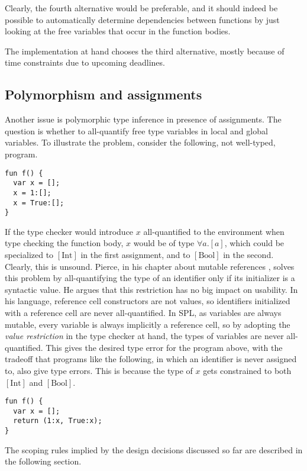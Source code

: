 \documentclass[a4paper]{article}
\begin{document}
Clearly, the fourth alternative would be preferable, and it should indeed be
possible to automatically determine dependencies between functions by just
looking at the free variables that occur in the function bodies.

The implementation at hand chooses the third alternative, mostly because of time
constraints due to upcoming deadlines.

\subsection{Polymorphism and assignments}

Another issue is polymorphic type inference in presence of assignments.  The
question is whether to all-quantify free type variables in local and global
variables.  To illustrate the problem, consider the following, not well-typed,
program.

\begin{verbatim}
fun f() {
  var x = [];
  x = 1:[];
  x = True:[];
}
\end{verbatim}

If the type checker would introduce $x$ all-quantified to the environment when
type checking the function body, $x$ would be of type $\forall a . [a]$, which
could be specialized to $[\text{Int}]$ in the first assignment, and to
$[\text{Bool}]$ in the second.  Clearly, this is unsound.  Pierce, in his
chapter about mutable references \cite{TaPL}, solves this problem by
all-quantifying the type of an identifier only if its initializer is a syntactic
value.  He argues that this restriction has no big impact on usability.  In his
language, reference cell constructors are not values, so identifiers initialized
with a reference cell are never all-quantified.  In SPL, as variables are always
mutable, every variable is always implicitly a reference cell, so by adopting
the \emph{value restriction} in the type checker at hand, the types of variables
are never all-quantified.  This gives the desired type error for the program
above, with the tradeoff that programs like the following, in which an identifier
is never assigned to, also give type errors. This is because the type of $x$ gets
constrained to both $[\text{Int}]$ and $[\text{Bool}]$.

\begin{verbatim}
fun f() {
  var x = [];
  return (1:x, True:x);
}
\end{verbatim}

The scoping rules implied by the design
decisions discussed so far are described in the following section.
\end{document}
